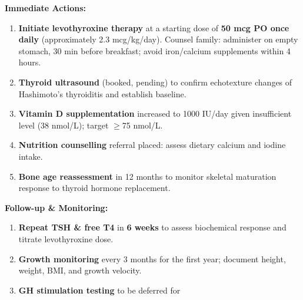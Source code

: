 \documentclass[11pt,a4paper]{article}
\begin{document}
\vspace{4mm}

\begin{tcolorbox}[pedteal, title={\faTasks\enspace Management Plan}]

\begin{minipage}[t]{0.48\linewidth}
  \vspace{0pt}
  \textbf{\color{PedTeal}Immediate Actions:}
  \begin{enumerate}[leftmargin=1.4em, itemsep=3pt, topsep=2pt,
    label={\color{PedTeal}\textbf{\arabic*.}}]
    \item \textbf{Initiate levothyroxine therapy} at a starting dose of
          \textbf{50 mcg PO once daily} (approximately 2.3 mcg/kg/day).
          Counsel family: administer on empty stomach, 30 min before breakfast;
          avoid iron/calcium supplements within 4 hours.
    \item \textbf{Thyroid ultrasound} (booked, pending) to confirm
          echotexture changes of Hashimoto's thyroiditis and establish baseline.
    \item \textbf{Vitamin D supplementation} increased to 1000 IU/day
          given insufficient level (38 nmol/L); target $\geq$75 nmol/L.
    \item \textbf{Nutrition counselling} referral placed:
          assess dietary calcium and iodine intake.
    \item \textbf{Bone age reassessment} in 12 months to monitor
          skeletal maturation response to thyroid hormone replacement.
  \end{enumerate}
\end{minipage}%
\hfill
\begin{minipage}[t]{0.48\linewidth}
  \vspace{0pt}
  \textbf{\color{PedTeal}Follow-up \& Monitoring:}
  \begin{enumerate}[leftmargin=1.4em, itemsep=3pt, topsep=2pt,
    label={\color{PedTeal}\textbf{\arabic*.}}]
    \item \textbf{Repeat TSH \& free T4} in \textbf{6 weeks} to assess
          biochemical response and titrate levothyroxine dose.
    \item \textbf{Growth monitoring} every 3 months for the first year;
          document height, weight, BMI, and growth velocity.
    \item \textbf{GH stimulation testing} to be deferred for

\end{enumerate}
\end{minipage}
\end{tcolorbox}
\end{document}
